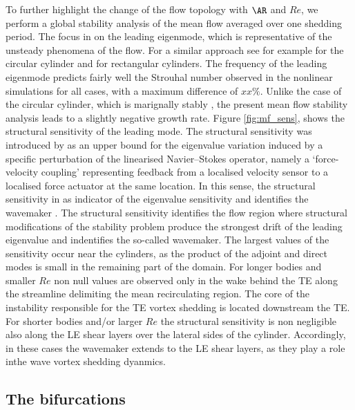 %
To further highlight the change of the flow topology with $\AR$ and $Re$, we perform a global stability analysis of the mean flow averaged over one shedding period. The focus in on the leading eigenmode, which is representative of the unsteady phenomena of the flow. For a similar approach see for example \cite{pier-2002,barkley-2006} for the circular cylinder and \cite{chiarini-quadrio-auteri-2022} for rectangular cylinders. 
%
The frequency of the leading eigenmode predicts fairly well the Strouhal number observed in the nonlinear simulations for all cases, with a maximum difference of $xx\%$. Unlike the case of the circular cylinder, which is marignally stably \citep{barkley-2006}, the present mean flow stability analysis leads to a slightly negative growth rate. Figure \ref{fig:mf_sens}, shows the structural sensitivity of the leading mode. The structural sensitivity was introduced by \cite{giannetti-luchini-2007} as an upper bound for the eigenvalue variation induced by a specific perturbation of the linearised Navier--Stokes operator, namely a `force-velocity coupling' representing feedback from a localised velocity sensor to a localised force actuator at the same location. In this sense, the structural sensitivity in as indicator of the eigenvalue sensitivity and identifies the wavemaker \citep{monkewitz-etal-1993}. The structural sensitivity identifies the flow region where structural modifications of the stability problem produce the strongest drift of the leading eigenvalue and indentifies the so-called wavemaker. The largest values of the sensitivity occur near the cylinders, as the product of the adjoint and direct modes is small in the remaining part of the domain. For longer bodies and smaller $Re$ non null values are observed only in the wake behind the TE along the streamline delimiting the mean recirculating region. The core of the instability responsible for the TE vortex shedding is located downstream the TE. For shorter bodies and/or larger $Re$ the structural sensitivity is non negligible also along the LE shear layers over the lateral sides of the cylinder. Accordingly, in these cases the wavemaker extends to the LE shear layers, as they play a role inthe wave vortex shedding dyanmics.

\subsection{The bifurcations}

